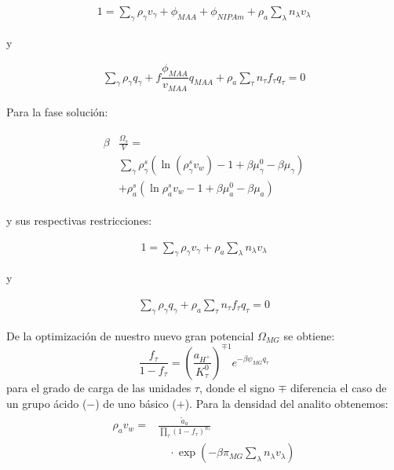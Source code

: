 \begin{align}
	1 = \sum_{\gamma } \rho_\gamma v_\gamma  + \phi_{MAA} + \phi_{NIPAm} + \rho_a \sum_\lambda n_\lambda v_\lambda
	\label{eq:gel:packing-g-total}
\end{align}

y 

\begin{align}
	\sum_{\gamma } {\rho_\gamma q_\gamma + f\dfrac{\phi_{MAA}}{v_{MAA}}q_{MAA}} + \rho_a \sum_\tau n_\tau f_\tau q_\tau = 0
\end{align}

Para la fase soluci\'on:

\begin{align}
	\begin{aligned}
		\beta&\frac{\Omega_s}{V}=\\& \sum_{\gamma   } {\rho^s_\gamma\left(\ln(\rho_\gamma^sv_w) -1 + \beta\mu_\gamma^0 - \beta\mu_\gamma\right)} \\
		& + \rho^s_a \left( \ln \rho^s_a v_w -1 +\beta\mu^0_a - \beta\mu_a\right)
	\end{aligned}
	\label{eq:gel:bulk-total}
\end{align}

y sus respectivas restricciones:

\begin{align}
	1 = \sum_{\gamma } \rho_\gamma v_\gamma  + \rho_a \sum_\lambda n_\lambda v_\lambda
\end{align}

y 

\begin{align}
	\sum_\gamma \rho_\gamma q_\gamma + \rho_a \sum_\tau n_\tau f_\tau q_\tau = 0
\end{align}



De la optimizaci\'on de nuestro nuevo gran potencial $\Omega_{MG}$  se obtiene:
%
\begin{equation}
\frac{f_\tau}{1-f_\tau}=\left(\frac{a_{H^+}}{K^0_\tau}\right)^{\mp 1} e^{-\beta \psi_{MG} q_\tau}
\label{eq:gel:f_ads}
\end{equation}
%
\noindent para el grado de carga de las unidades $\tau$, donde el signo $\mp$ diferencia el caso de un grupo \'acido ($-$) de uno b\'asico ($+$).
Para la densidad del analito obtenemos:
%
\begin{align}
    \begin{aligned}
   \rho_a v_w =&\frac{ \tilde{a}_a}{\prod_\tau \left(1-f_\tau\right)^{n_\tau}}\\
&\quad \cdot\exp{\left(-\beta \pi_{MG} \sum_\lambda n_\lambda v_\lambda \right)} 
    \end{aligned}\label{eq:gel:rho_ads}
\end{align}
%

